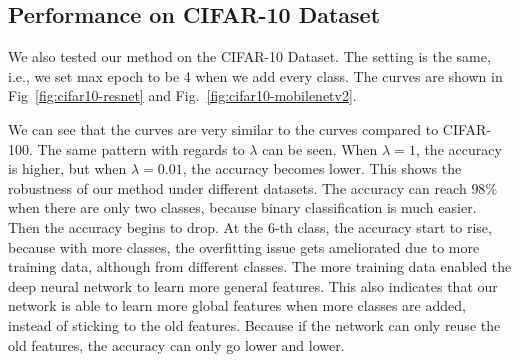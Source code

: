 \subsection{Performance on CIFAR-10 Dataset}
We also tested our method on the CIFAR-10 Dataset. The setting is the same, i.e., we set max epoch to be 4 when we add every class. The curves are shown in Fig~\ref{fig:cifar10-resnet} and Fig.~\ref{fig:cifar10-mobilenetv2}.



We can see that the curves are very similar to the curves compared to CIFAR-100. The same pattern with regards to $\lambda$ can be seen. When $\lambda=1$, the accuracy is higher, but when $\lambda=0.01$, the accuracy becomes lower. This shows the robustness of our method under different datasets. The accuracy can reach $98\%$ when there are only two classes, because binary classification is much easier. Then the accuracy begins to drop. At the 6-th class, the accuracy start to rise, because with more classes, the overfitting issue gets ameliorated due to more training data, although from different classes. The more training data enabled the deep neural network to learn more general features. This also indicates that our network is able to learn more global features when more classes are added, instead of sticking to the old features. Because if the network can only reuse the old features, the accuracy can only go lower and lower.

